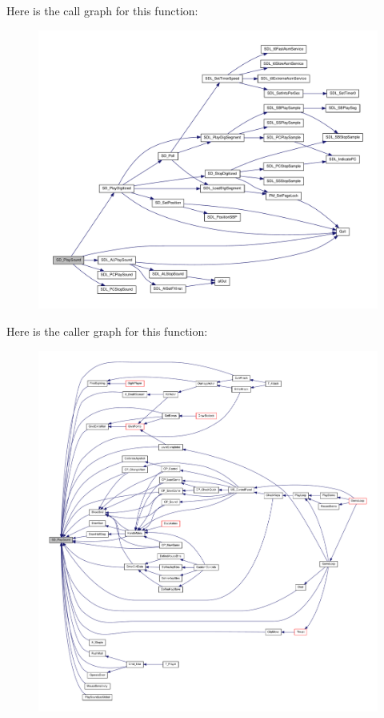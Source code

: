Here is the call graph for this function:
\nopagebreak
\begin{figure}[H]
\begin{center}
\leavevmode
\includegraphics[width=400pt]{ID__SD_8H_af6a678e2015e6474a341bbd8ab03c12f_cgraph}
\end{center}
\end{figure}




Here is the caller graph for this function:
\nopagebreak
\begin{figure}[H]
\begin{center}
\leavevmode
\includegraphics[width=400pt]{ID__SD_8H_af6a678e2015e6474a341bbd8ab03c12f_icgraph}
\end{center}
\end{figure}


